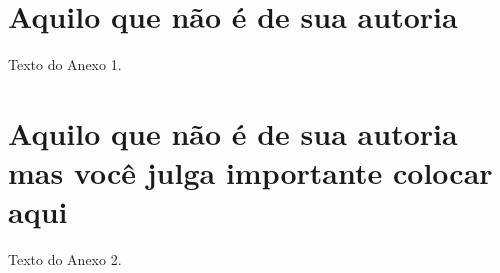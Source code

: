 \chapter{Aquilo que n\~ao \'e de sua autoria}
\label{Anexo}

Texto do Anexo 1.

\chapter{Aquilo que n\~ao \'e de sua autoria mas voc\^e julga importante colocar aqui}
\label{Anexo}

Texto do Anexo 2.



